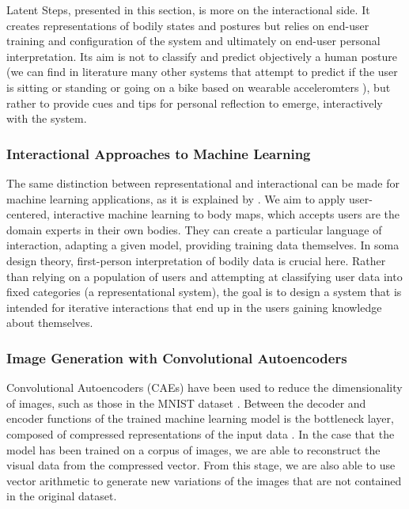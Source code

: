 Latent Steps, presented in this section, is more on the interactional side. It creates representations of bodily states and postures but relies on end-user training and configuration of the system and ultimately on end-user personal interpretation. Its aim is not to classify and predict objectively a human posture (we can find in literature many other systems that attempt to predict if the user is sitting or standing or going on a bike based on wearable acceleromters \cite{slim_survey_2019}), but rather to provide cues and tips for personal reflection to emerge, interactively with the system.

\subsubsection{Interactional Approaches to Machine Learning}

The same distinction between representational and interactional can be made for machine learning applications, as it is explained by \citeauthor{gillies_understanding_2019} \cite{gillies_understanding_2019} \cite{bishop_non-representational_2014}. We aim to apply user-centered, interactive machine learning to body maps, which accepts users are the domain experts in their own bodies. They can create a particular language of interaction, adapting a given model, providing training data themselves. In soma design theory, first-person interpretation of bodily data is crucial here. Rather than relying on a population of users and attempting at classifying user data into fixed categories (a representational system), the goal is to design a system that is intended for iterative interactions that end up in the users gaining knowledge about themselves.

\subsubsection{Image Generation with Convolutional Autoencoders}

Convolutional Autoencoders (CAEs) have been used to reduce the dimensionality of images, such as those in the MNIST dataset \cite{wang_auto-encoder_2016}. Between the decoder and encoder functions of the trained machine learning model is the bottleneck layer, composed of compressed representations of the input data \cite{zhang_better_nodate}. In the case that the model has been trained on a corpus of images, we are able to reconstruct the visual data from the compressed vector. From this stage, we are also able to use vector arithmetic to generate new variations of the images that are not contained in the original dataset. 

